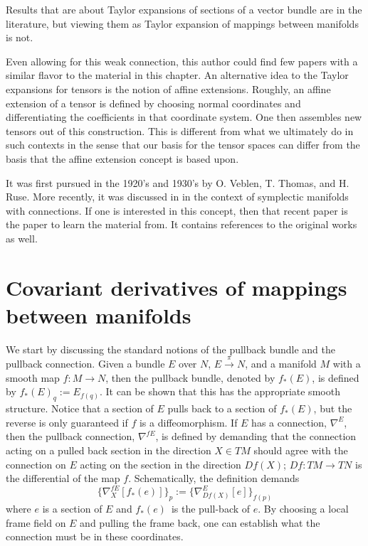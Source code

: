 \documentclass[11pt]{article}
\theoremstyle{remark}
\begin{document}
Results that are about Taylor expansions of sections of a vector bundle
are in the literature, but viewing them as 
Taylor expansion of mappings between
manifolds is not. 


Even
allowing for this weak connection, 
this author could find few papers with a similar flavor to the
material in this chapter.
 An alternative idea to the Taylor expansions for tensors 
is the notion of affine
extensions. Roughly, an affine extension of a tensor 
is defined by choosing normal
coordinates and differentiating the coefficients in that coordinate
system. One then assembles new tensors out of this construction. 
This is different from what we ultimately do in such contexts in the
sense that our basis for the tensor spaces can differ from the basis
that the affine extension concept is based upon.


It was first pursued in the 1920's and 1930's by O. Veblen, T. Thomas,
and H. Ruse. 
More recently, it was discussed in
\cite{GRS98} in the context of symplectic manifolds with
connections. If one is interested in this concept, then that recent
paper  is the paper to learn the material from. It contains references
to the original works as well.  


\section{Covariant derivatives of mappings between manifolds}
\label{s:map}

We start by discussing the standard notions of the pullback bundle
and the pullback 
connection. Given a bundle $E$ over $N$, \ensuremath{{E} \overset{\pi}{\rightarrow} {N}}, and a
manifold $M$ with a smooth map $f: M \to N$, then the pullback
bundle, denoted by \ensuremath{{f}_{*}({E})}, is defined by $\ensuremath{{f}_{*}({E})}_{\ensuremath{q}} \ensuremath{:=}
E_{f(\ensuremath{q})}$. It can be shown that this has the appropriate smooth
structure. Notice that a section of $E$ pulls back to a section of
\ensuremath{{f}_{*}({E})}, but the reverse is only guaranteed if $f$ is a
diffeomorphism. 
If $E$ has a connection, \ensuremath{\nabla^{E}_{} {}}, then the pullback
connection, \ensuremath{\nabla^{fE}_{} {}}, is defined by demanding that the
connection acting on a pulled back section in the direction $X \in TM$ 
should agree with the connection on $E$ acting on the section in the
direction $Df (X)$; $Df : TM \to TN$ is the differential of the map
$f$.  Schematically, the definition demands 
\begin{equation}
\{ \ensuremath{{{\nabla}}_{X}^{fE}{[\ensuremath{{f}_{*}({e})}]}}\}_{p} 
\ensuremath{:=} 
\{\ensuremath{{{\nabla}}_{Df(X)}^{E}{[e]}}\}_{f(p)}
\end{equation}
where $e$ is a section of $E$ and \ensuremath{{f}_{*}({e})}\ is the pull-back
of $e$. 
By choosing a local frame field on $E$ and pulling the frame back, one can
establish what the connection must be in these coordinates.
\end{document}
